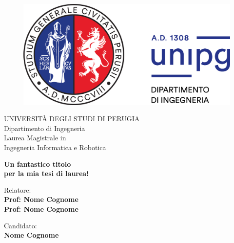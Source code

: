 \begin{titlepage}
\begin{figure}[!htb]
    \centering
    \includegraphics[keepaspectratio=true,scale=0.5]{figures/logounipg2021}
\end{figure}

\begin{center}
    \LARGE{UNIVERSIT\`A DEGLI STUDI DI PERUGIA}
    \vspace{5mm}
    \\ \Large{Dipartimento di Ingegneria}
    \vspace{5mm}
    \\ \LARGE{Laurea Magistrale in \\ Ingegneria Informatica e Robotica}
\end{center}

\vspace{15mm}
\begin{center}
    {\LARGE{\bf Un fantastico titolo\\ \vspace{5mm} per la mia tesi di laurea! }}
    
    
\end{center}
\vspace{30mm}

\begin{minipage}[t]{0.47\textwidth}
	{\large{Relatore:}{\normalsize\vspace{3mm}
	\bf\\ \large{Prof: Nome Cognome} \normalsize\vspace{3mm}\bf \\ \large{Prof: Nome Cognome}}}
\end{minipage}
\hfill
\begin{minipage}[t]{0.47\textwidth}\raggedleft
	{\large{Candidato:}{\normalsize\vspace{3mm} \bf\\ \large{Nome Cognome}}}
\end{minipage}

\vspace{30mm}
\hrulefill
\\

\end{titlepage}